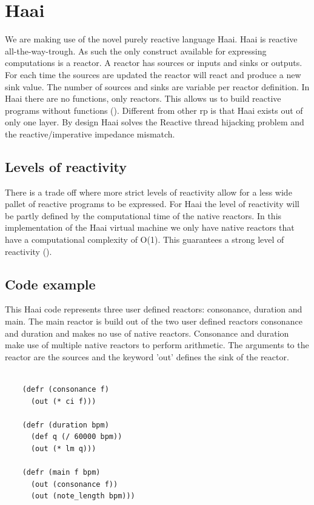 \documentclass[a4paper]{book}
\begin{document}
\section{Haai}
We are making use of the novel purely reactive language Haai. Haai is reactive all-the-way-trough. As such the only construct available for expressing computations is a reactor. A reactor has sources or inputs and sinks or outputs. For each time the sources are updated the reactor will react and produce a new sink value. The number of sources and sinks are variable per reactor definition. In Haai there are no functions, only reactors. This allows us to build reactive programs without functions (\cite{oeyen_reactive_2024}). Different from other rp is that Haai exists out of only one layer. By design Haai solves the Reactive thread hijacking problem and the reactive/imperative impedance mismatch. 

\subsection*{Levels of reactivity}
There is a trade off where more strict levels of reactivity allow for a less wide pallet of reactive programs to be expressed. For Haai the level of reactivity will be partly defined by the computational time of the native reactors. In this implementation of the Haai virtual machine we only have native reactors that have a computational complexity of O(1). This guarantees a strong level of reactivity (\cite{oeyen_reactive_2024}).

\subsection*{Code example}
This Haai code represents three user defined reactors: consonance, duration and main. The main reactor is build out of the two user defined reactors consonance and duration and makes no use of native reactors. Consonance and duration make use of multiple native reactors to perform arithmetic. The arguments to the reactor are the sources and the keyword 'out' defines the sink of the reactor.
 
\begin{verbatim}
	
	(defr (consonance f)
	  (out (* ci f)))
	
	(defr (duration bpm)
	  (def q (/ 60000 bpm))
	  (out (* lm q)))
	
	(defr (main f bpm)
	  (out (consonance f))
	  (out (note_length bpm)))
	
	
\end{verbatim}
\end{document}
